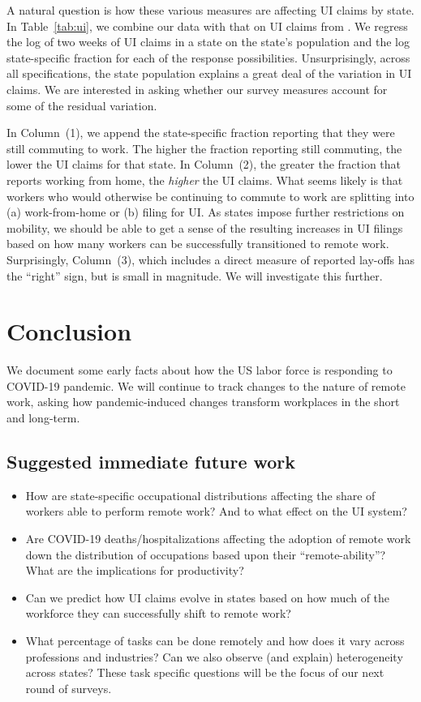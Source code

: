 \documentclass[12pt]{article}
\begin{document}
A natural question is how these various measures are affecting UI claims by state. 
In Table~\ref{tab:ui}, we combine our data with that on UI claims from \cite{goldsmith2020}.
We regress the log of two weeks of UI claims in a state on the state's population and the log state-specific fraction for each of the response possibilities.  
Unsurprisingly, across all specifications, the state population explains a great deal of the variation in UI claims.
We are interested in asking whether our survey measures account for some of the residual variation.



In Column~(1), we append the state-specific fraction reporting that they were still commuting to work.
The higher the fraction reporting still commuting, the lower the UI claims for that state.
In Column~(2), the greater the fraction that reports working from home, the \emph{higher} the UI claims.
What seems likely is that workers who would otherwise be continuing to commute to work are splitting into (a) work-from-home or (b) filing for UI.
As states impose further restrictions on mobility, we should be able to get a sense of the resulting increases in UI filings based on how many workers can be successfully transitioned to remote work. 
Surprisingly, Column~(3), which includes a direct measure of reported lay-offs has the ``right'' sign, but is small in magnitude.
We will investigate this further.

\section{Conclusion}
We document some early facts about how the US labor force is responding to COVID-19 pandemic.
We will continue to track changes to the nature of remote work, asking how pandemic-induced changes transform workplaces in the short and long-term.

\subsection{Suggested immediate future work} 

\begin{itemize}
\item How are state-specific occupational distributions affecting the share of workers able to perform remote work? And to what effect on the UI system? 
\item Are COVID-19 deaths/hospitalizations affecting the adoption of remote work down the distribution of occupations based upon their ``remote-ability''? What are the implications for productivity?
\item Can we predict how UI claims evolve in states based on how much of the workforce they can successfully shift to remote work? 
\item What percentage of tasks can be done remotely and how does it vary across professions and industries? Can we also observe (and explain) heterogeneity across states? These task specific questions will be the focus of our next round of surveys. 
\end{itemize}
\end{document}

